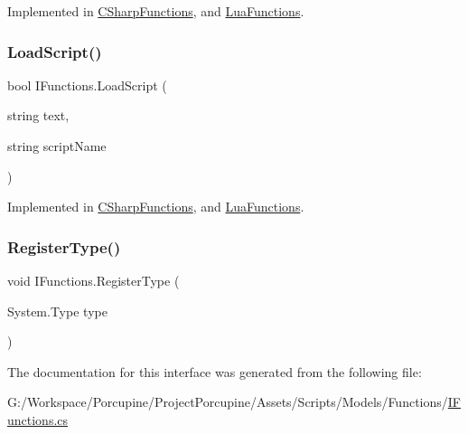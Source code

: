 Implemented in \hyperlink{class_c_sharp_functions_ac272ce8ef722b90c5c9c95c93527f85a}{C\+Sharp\+Functions}, and \hyperlink{class_lua_functions_a1bcc0469b7501e9e949e0575aba7fb80}{Lua\+Functions}.

\mbox{\label{interface_i_functions_acdee59b5855ab9e87fcf11e3cdf9c967}} 
\subsubsection{\texorpdfstring{Load\+Script()}{LoadScript()}}
{\footnotesize\ttfamily bool I\+Functions.\+Load\+Script (\begin{DoxyParamCaption}\item[{string}]{text,  }\item[{string}]{script\+Name }\end{DoxyParamCaption})}



Implemented in \hyperlink{class_c_sharp_functions_a547a7d8ed518aa7395920c07ad59d0f4}{C\+Sharp\+Functions}, and \hyperlink{class_lua_functions_af17a439c6a875a777b9b2e5bc3f5c072}{Lua\+Functions}.

\mbox{\label{interface_i_functions_ab61bd915f0f4e1aa0b2ba6fe268a4790}} 
\subsubsection{\texorpdfstring{Register\+Type()}{RegisterType()}}
{\footnotesize\ttfamily void I\+Functions.\+Register\+Type (\begin{DoxyParamCaption}\item[{System.\+Type}]{type }\end{DoxyParamCaption})}



The documentation for this interface was generated from the following file\+:\begin{DoxyCompactItemize}
\item 
G\+:/\+Workspace/\+Porcupine/\+Project\+Porcupine/\+Assets/\+Scripts/\+Models/\+Functions/\hyperlink{_i_functions_8cs}{I\+Functions.\+cs}\end{DoxyCompactItemize}
